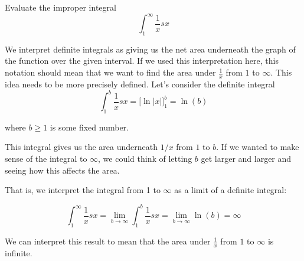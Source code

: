 \documentclass{ximera}
\begin{document}
\begin{example}
Evaluate the improper integral
\[ 
\int_{1}^{\infty} \frac{1}{x} sx
\]
\begin{explanation}

We interpret definite integrals as giving us the net area underneath the graph of the function over the given interval. If we used this interpretation here, this notation should mean that we want to find the area under $\frac{1}{x}$ from $1$ to $\infty$.  This idea needs to be more precisely defined.  Let's consider the definite integral
\[
\int_{1}^{b} \frac{1}{x} sx=\bigg[\ln|x|\bigg]_{1}^{b}=\ln(b)
\]

where $b \geq 1$ is some fixed number. 

\begin{image}
\end{image}


 This integral gives us the area underneath $1/x$ from $1$ to $b$. If we wanted to make sense of the integral to $\infty$, we could think of letting $b$ 
get larger and larger and seeing how this affects the area. 

That is, we interpret the integral from 1 to $\infty$ as a limit of a definite integral:

\[
\int_{1}^{\infty} \frac{1}{x} sx= \lim_{b \to \infty} \int_{1}^{b} \frac{1}{x} sx= \lim_{b \to \infty} \ln(b) = \infty
\]

We can interpret this result to mean that the area under $\frac{1}{x}$ from $1$ to $\infty$ is infinite.
\end{explanation}
\end{example}
\end{document}
